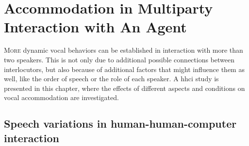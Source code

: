 \chapter{Accommodation in Multiparty Interaction with An Agent}
\label{chap:speech_variations_in_hhci}

\lettrine{M}{ore} dynamic vocal behaviors can be established in interaction with more than two speakers.
This is not only due to additional possible connections between interlocutors, but also because of additional factors that might influence them as well, like the order of speech or the role of each speaker.
A \acl{hhci} study is presented in this chapter, where the effects of different aspects and conditions on vocal accommodation are investigated.

\pagebreak

\section{Speech variations in human-human-computer interaction}
\label{sec:accommodation_in_multiparty_interaction_with_an_agent}


